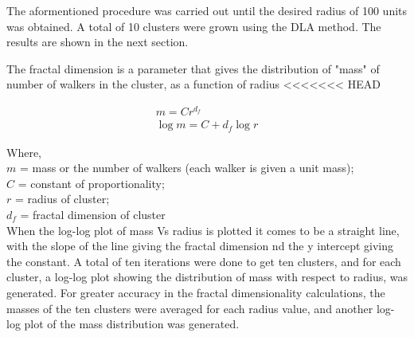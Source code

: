 \documentclass[a4paper,12pt]{article}
\begin{document}
\indent The aformentioned procedure was carried out until the desired radius of 100 units was obtained.  A total of 10 clusters were grown using the DLA method.  The
results are shown in the next section.


\indent The fractal dimension is a parameter that gives the distribution of "mass" of number of walkers in the cluster, as a function of radius
<<<<<<< HEAD

\begin{eqnarray}	
	m = C r^{d_f} \\
	\log{m} = C + d_f\log{r}
\end{eqnarray}\label{fractal dimension}

Where, \\
$m$ = mass or the number of walkers (each walker is given a unit mass);\\
$C$ = constant of proportionality; \\
$r$ = radius of cluster; \\
$d_f$ = fractal dimension of cluster \\

\indent When the log-log plot of mass Vs radius is plotted it comes to be a straight line, with the slope of the line giving the fractal dimension nd the y intercept giving the constant. 
A total of ten iterations were done to get ten clusters, and for each cluster, a log-log plot showing the distribution of mass with respect to radius, was generated. For greater accuracy in the fractal dimensionality
calculations, the masses of the ten clusters were averaged for each radius value, and another log-log plot of the mass distribution was generated.
\end{document}
